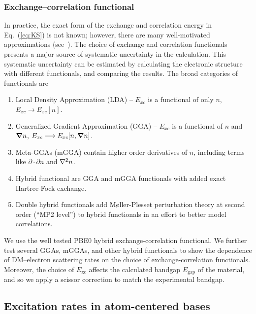 \documentclass[
    prd, twocolumn, superscriptaddress, nofootinbib, amsmath, amssymb,
    aps, floatfix,preprintnumbers
]{revtex4-2}
\begin{document}
        \subsubsection{Exchange--correlation functional}\label{subsubsec:2.1.3}
        In practice, the exact form of the exchange and correlation energy in Eq.~(\ref{eq:KS}) is  not known; however, there are many well-motivated approximations (see~\cite{LibXC}). The choice of exchange and correlation functionals presents a major source of systematic uncertainty in the calculation. This systematic uncertainty can be estimated by calculating the electronic structure with different functionals, and comparing the results. The broad categories of functionals are
        \begin{enumerate}
            \item Local Density Approximation (LDA) -- $E_{xc}$ is a functional of only $n$, $E_{xc}\longrightarrow E_{xc}[n].$
            \item Generalized Gradient Approximation (GGA) -- $E_{xc}$ is a functional of $n$ and $\grad n$, $E_{xc}\longrightarrow E_{xc}[n, \grad n]$.
            \item Meta-GGAs (mGGA) contain higher order derivatives of $n$, including terms like $\partial\cdot\partial n$ and $\laplacian n$. 
            
            \item Hybrid functional are GGA and mGGA functionals with added exact Hartree-Fock exchange.
            \item Double hybrid functionals add M\o ller-Plesset perturbation theory at second order (``MP2 level'') to hybrid functionals in an effort to better model correlations. 
        \end{enumerate}
        
        We use the well tested PBE0 hybrid exchange-correlation functional. We further test several GGAs, mGGAs, and other hybrid functionals to show the dependence of DM--electron scattering rates on the choice of exchange-correlation functionals. Moreover, the choice of $E_\mathrm{xc}$ affects the calculated bandgap $E_\mathrm{gap}$ of the material, and so we apply a scissor correction to match the experimental bandgap. 
        
    \subsection{Excitation rates in atom-centered bases}\label{subsec:2.2}
\end{document}
